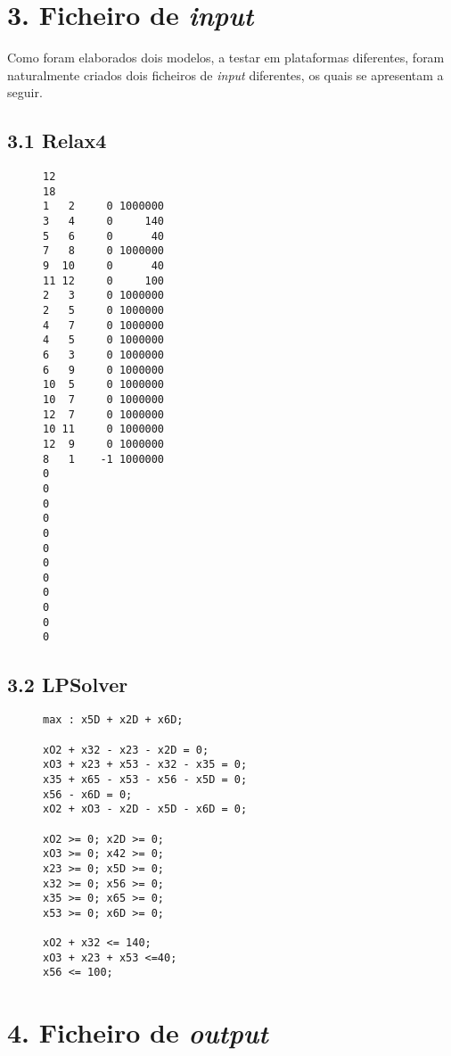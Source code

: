 \documentclass[a4paper,12pt]{article}
\begin{document}
\section*{3. Ficheiro de \textit{input}}
Como foram elaborados dois modelos, a testar em plataformas diferentes, foram naturalmente criados dois ficheiros de \textit{input} diferentes, os quais se apresentam a seguir.

\subsection*{3.1 Relax4}
\begin{figure}[H]
\begin{lstlisting}
12
18
1   2     0 1000000
3   4     0     140
5   6     0      40
7   8     0 1000000
9  10     0      40
11 12     0     100
2   3     0 1000000
2   5     0 1000000
4   7     0 1000000
4   5     0 1000000
6   3     0 1000000
6   9     0 1000000
10  5     0 1000000
10  7     0 1000000
12  7     0 1000000
10 11     0 1000000
12  9     0 1000000
8   1    -1 1000000
0
0
0
0
0
0
0
0
0
0
0
0
\end{lstlisting}
\end{figure}

\subsection*{3.2 LPSolver}
\begin{figure}[H]
\begin{lstlisting}
max : x5D + x2D + x6D;

xO2 + x32 - x23 - x2D = 0;
xO3 + x23 + x53 - x32 - x35 = 0;
x35 + x65 - x53 - x56 - x5D = 0;
x56 - x6D = 0;
xO2 + xO3 - x2D - x5D - x6D = 0;

xO2 >= 0; x2D >= 0;
xO3 >= 0; x42 >= 0;
x23 >= 0; x5D >= 0;
x32 >= 0; x56 >= 0;
x35 >= 0; x65 >= 0;
x53 >= 0; x6D >= 0;

xO2 + x32 <= 140;
xO3 + x23 + x53 <=40;
x56 <= 100;
\end{lstlisting}
\end{figure}

\section*{4. Ficheiro de \textit{output}}
\end{document}

